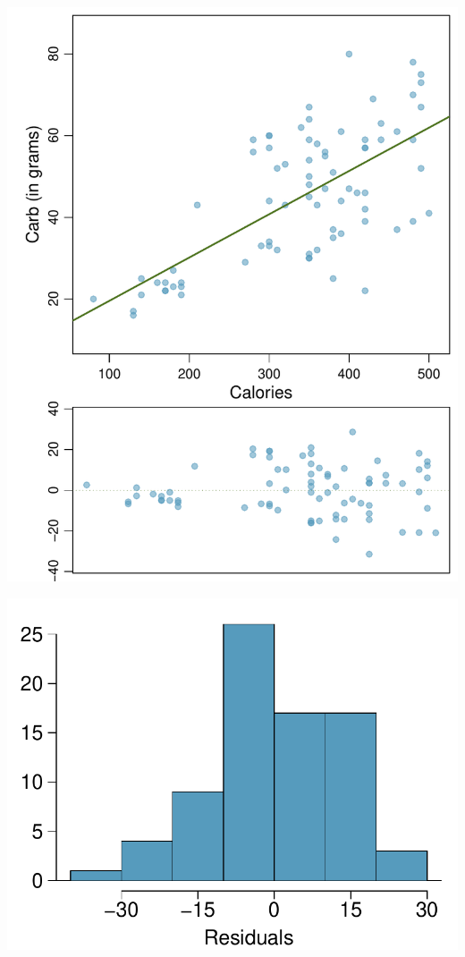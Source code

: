 {\begin{center}
\begin{minipage}[c]{0.53\textwidth}
\includegraphics[width=\textwidth]{07/figures/eoce/starbucks/carb_cals}
\end{minipage}\hspace{5mm}%
\begin{minipage}[c]{0.4\textwidth}
\includegraphics[width=\textwidth]{07/figures/eoce/starbucks/carb_cals_res_hist}
\end{minipage}
\end{center}
}{}

